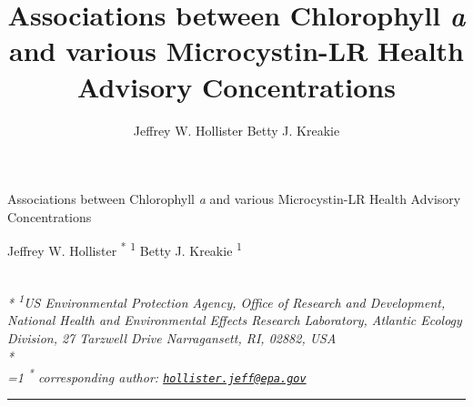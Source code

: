 \documentclass[11pt,]{article}
\title{Associations between Chlorophyll \emph{a} and various Microcystin-LR
Health Advisory Concentrations}
\author{
Jeffrey W. Hollister
Betty J. Kreakie
}
\date{}
\begin{document}
\begin{singlespace}
\begin{center}
\huge Associations between Chlorophyll \emph{a} and various Microcystin-LR
Health Advisory Concentrations
\end{center}
\begin{center}
\large
Jeffrey W. Hollister \textsuperscript{*} \textsuperscript{1} 
Betty J. Kreakie \textsuperscript{1} 
\end{center}
\begin{justify}
\footnotesize \emph{ 
\\*
\textsuperscript{1}US Environmental Protection Agency, Office of Research and Development,
National Health and Environmental Effects Research Laboratory, Atlantic
Ecology Division, 27 Tarzwell Drive Narragansett, RI, 02882, USA\\*
}
\setcounter{num}{1}
\\[0.1cm]
\footnotesize \emph{ 
\ifnum\value{num}=1%
\textsuperscript{*} corresponding author:
\fi
\href{mailto:hollister.jeff@epa.gov}{\nolinkurl{hollister.jeff@epa.gov}}
}
\end{justify}
\normalsize

\end{singlespace}


\singlespace

\vspace{2mm}

\hrule
\end{document}
